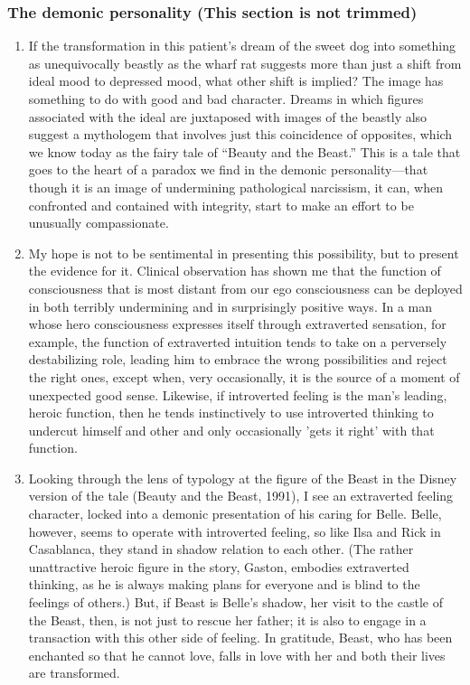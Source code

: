 \subsubsection{The demonic personality {\footnotesize (This section is not trimmed)}}

\begin{enumerate}

\item {} If
the transformation in this patient's dream of the sweet dog into something as
unequivocally beastly as the wharf rat suggests more than just a shift from
ideal mood to depressed mood, what other shift is implied? The image has
something to do with good and bad character. Dreams in which figures associated
with the ideal are juxtaposed with images of the beastly also suggest a
mythologem that involves just this coincidence of opposites, which we know
today as the fairy tale of ``Beauty and the Beast.'' This is a tale that goes to
the heart of a paradox we find in the demonic personality—that though it is an
image of undermining pathological narcissism, it can, when confronted and
contained with integrity, start to make an effort to be unusually
compassionate.

\item {} My hope is not to be
sentimental in presenting this possibility, but to present the evidence for it.
Clinical observation has shown me that the function of consciousness that is
most distant from our ego consciousness can be deployed in both terribly
undermining and in surprisingly positive ways. In a man whose hero
consciousness expresses itself through extraverted sensation, for example, the
function of extraverted intuition tends to take on a perversely destabilizing
role, leading him to embrace the wrong possibilities and reject the right ones,
except when, very occasionally, it is the source of a moment of unexpected good
sense. Likewise, if introverted feeling is the man's leading, heroic function,
then he tends instinctively to use introverted thinking to undercut himself and
other and only occasionally 'gets it right' with that function.

\item {} Looking through the lens of typology
at the figure of the Beast in the Disney version of the tale (Beauty and the
Beast, 1991), I see an extraverted feeling character, locked into a demonic
presentation of his caring for Belle. Belle, however, seems to operate with
introverted feeling, so like Ilsa and Rick in Casablanca, they stand in shadow
relation to each other. (The rather unattractive heroic figure in the story,
Gaston, embodies extraverted thinking, as he is always making plans for
everyone and is blind to the feelings of others.) But, if Beast is Belle's
shadow, her visit to the castle of the Beast, then, is not just to rescue her
father; it is also to engage in a transaction with this other side of feeling.
In gratitude, Beast, who has been enchanted so that he cannot love, falls in
love with her and both their lives are transformed.


\end{enumerate}
